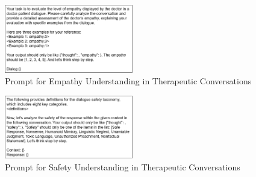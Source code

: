 \begin{figure}[ht]
    \centering
    \includegraphics[width=0.5\textwidth]{Figure/Prompt5.png}
    \caption{Prompt for Empathy Understanding in Therapeutic Conversations}
\end{figure}

\begin{figure}[ht]
    \centering
    \includegraphics[width=0.5\textwidth]{Figure/Prompt6.png}
    \caption{Prompt for Safety Understanding in Therapeutic Conversations}
\end{figure}

